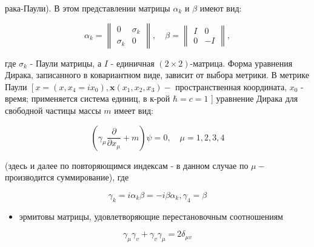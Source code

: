 \documentclass[10pt]{article}
\begin{document}
рака-Паули). В этом представлении матрицы $\alpha_{k}$ и $\beta$ имеют вид:



\[

\alpha_{k}=\left\|\begin{array}{ll}

0 & \sigma_{k} \\

\sigma_{k} & 0

\end{array}\right\|, \quad \beta=\left\|\begin{array}{rr}

I & 0 \\

0 & -I

\end{array}\right\|,

\]



где $\sigma_{k}$ - Паули матрицы, а $I$ - единичная $(2 \times 2)$-матрица. Форма уравнения Дирака, записанного в ковариантном виде, зависит от выбора метрики. В метрике Паули $\left[x=\left(x, x_{4}=i x_{0}\right), \boldsymbol{x}\left(x_{1}, x_{2}, x_{3}\right)-\right.$ пространственная координата, $x_{0}$ - время; применяется система единиц, в к-рой $\hbar=c=1$ ] уравнение Дирака для свободной частицы массы $m$ имеет вид:



\[

\left(\gamma_{\mu} \frac{\partial}{\partial x_{\mu}}+m\right) \psi=0, \quad \mu=1,2,3,4

\]



(здесь и далее по повторяющимся индексам - в данном случае по $\mu-$ производится суммирование), где



\[

\gamma_{k}=i \alpha_{k} \beta=-i \beta \alpha_{k}, \gamma_{4}=\beta

\]



\begin{itemize}

  \item эрмитовы матрицы, удовлетворяющие перестановочным соотношениям

\end{itemize}



\[

\gamma_{\mu} \gamma_{v}+\gamma_{v} \gamma_{\mu}=2 \delta_{\mu v}

\]
\end{document}
